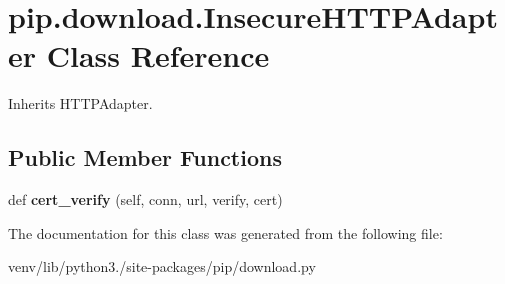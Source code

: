 \hypertarget{classpip_1_1download_1_1_insecure_h_t_t_p_adapter}{}\section{pip.\+download.\+Insecure\+H\+T\+T\+P\+Adapter Class Reference}
\label{classpip_1_1download_1_1_insecure_h_t_t_p_adapter}


Inherits H\+T\+T\+P\+Adapter.

\subsection*{Public Member Functions}
\begin{DoxyCompactItemize}
\item 
\mbox{\label{classpip_1_1download_1_1_insecure_h_t_t_p_adapter_a9f2e0efe8fcd4bae1fbe19051b2498af}} 
def {\bfseries cert\+\_\+verify} (self, conn, url, verify, cert)
\end{DoxyCompactItemize}


The documentation for this class was generated from the following file\+:\begin{DoxyCompactItemize}
\item 
venv/lib/python3./site-\/packages/pip/download.\+py\end{DoxyCompactItemize}

